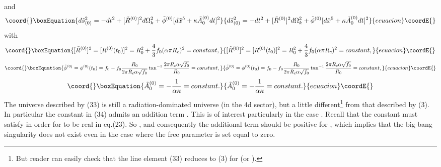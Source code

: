 \documentclass[a4paper,12pt]{article}
\begin{document}
and
\begin{equation}\coord{}\boxEquation{
d\tilde{s}^2_{(0)} =-dt^2 +[\tilde{R}^{(0)}]^2d\Omega^2_{k} +
\tilde{\phi}^{(0)}[d\tilde{x}^5 + \kappa \tilde{A}^{(0)}_0dt]^2
}{
d\tilde{s}^2_{(0)} =-dt^2 +[\tilde{R}^{(0)}]^2d\Omega^2_{k} +
\tilde{\phi}^{(0)}[d\tilde{x}^5 + \kappa \tilde{A}^{(0)}_0dt]^2
}{ecuacion}\coordE{}\end{equation}
with
\begin{equation}\coord{}\boxEquation{
[\tilde{R}^{(0)}]^2 =[R^{(0)}(t_0)]^2 =R^2_0 +
\frac{4}{3}f_0(\alpha \pi R_c)^2 =constant ,
}{
[\tilde{R}^{(0)}]^2 =[R^{(0)}(t_0)]^2 =R^2_0 +
\frac{4}{3}f_0(\alpha \pi R_c)^2 =constant ,
}{ecuacion}\coordE{}\end{equation}
\begin{equation}\coord{}\boxEquation{
\tilde{\phi}^{(0)} =\phi^{(0)}(t_0) =f_0-f_0\frac{R_0}{2\pi R_c
\alpha \sqrt{f_0}}\tan^{-1} \frac{2 \pi R_c \alpha
\sqrt{f_0}}{R_0} = constant,
}{
\tilde{\phi}^{(0)} =\phi^{(0)}(t_0) =f_0-f_0\frac{R_0}{2\pi R_c
\alpha \sqrt{f_0}}\tan^{-1} \frac{2 \pi R_c \alpha
\sqrt{f_0}}{R_0} = constant,
}{ecuacion}\coordE{}\end{equation}
\begin{equation}\coord{}\boxEquation{
\tilde{A}^{(0)}_0 = -\frac{1}{\alpha \kappa } = constant .
}{
\tilde{A}^{(0)}_0 = -\frac{1}{\alpha \kappa } = constant .
}{ecuacion}\coordE{}\end{equation}
The universe described by (33) is still a radiation-dominated
universe (in the 4d sector), but a little different\footnote{But
reader can easily check that the line element (33) reduces to (3)
for \coordHE{} (or \coordHE{}).} from that
described by (3). In particular the constant \coordHE{} in (34)
admits an addition term \coordHE{}. This is of
interest particularly in the case \coordHE{}. Recall that the constant
\coordHE{} must satisfy \coordHE{} in order for \myHighlight{$\alpha$}\coordHE{} to be real
in eq.(23). So \coordHE{}, and consequently the additional term
\coordHE{} should be positive for \coordHE{}, which
implies that the big-bang singularity does not exist even in the
case where the free parameter \coordHE{} is set equal to zero.
\end{document}
